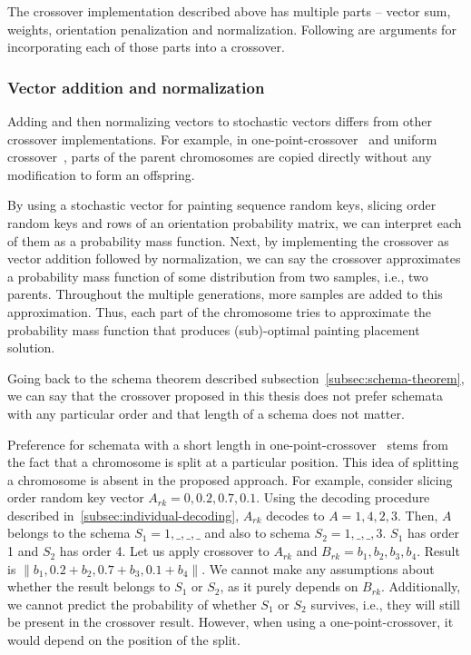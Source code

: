 The crossover implementation described above has multiple parts – vector sum, weights, orientation penalization and normalization.
Following are arguments for incorporating each of those parts into a crossover.

\subsubsection*{Vector addition and normalization}

Adding and then normalizing vectors to stochastic vectors differs from other crossover implementations.
For example, in one-point-crossover~\cite{hollandAdaptationNaturalArtificial1975} and
uniform crossover~\cite{uniformCrossover1989}, parts of the parent chromosomes are copied directly without any modification to form an offspring.

By using a stochastic vector for painting sequence random keys, slicing order random keys and rows of an orientation probability matrix,
we can interpret each of them as a probability mass function.
Next, by implementing the crossover as vector addition followed by normalization, we can
say the crossover approximates a probability mass function of some distribution from two samples, i.e., two parents.
Throughout the multiple generations, more samples are added to this approximation.
Thus, each part of the chromosome tries to approximate the probability mass function
that produces (sub)-optimal painting placement solution.

Going back to the schema theorem described subsection~\ref{subsec:schema-theorem},
we can say that the crossover proposed in this thesis does not prefer schemata with any particular order
and that length of a schema does not matter.

Preference for schemata with a short length in one-point-crossover~\cite{hollandAdaptationNaturalArtificial1975}
stems from the fact that a chromosome is split at a particular position.
This idea of splitting a chromosome is absent in the proposed approach.
For example, consider slicing order random key vector $A_{rk} = 0, 0.2, 0.7, 0.1$.
Using the decoding procedure described in~\ref{subsec:individual-decoding},
$A_{rk}$ decodes to $A = 1, 4, 2, 3$.
Then, $A$ belongs to the schema $S_1 = 1, \_, \_, \_$ and also to schema $S_2 = 1, \_, \_, 3$.
$S_1$ has order 1 and $S_2$ has order 4.
Let us apply crossover to $A_{rk}$ and $B_{rk} = b_1, b_2, b_3, b_4$.
Result is $\|b_1, 0.2+b_2, 0.7+b_3, 0.1+b_4\|$.
We cannot make any assumptions about whether the result belongs to $S_1$ or $S_2$, as it purely depends on $B_{rk}$.
Additionally, we cannot predict the probability of whether $S_1$ or $S_2$ survives, i.e., they will still be present in the crossover result.
However, when using a one-point-crossover, it would depend on the position of the split.

